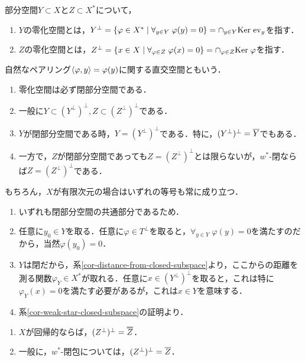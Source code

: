 \documentclass[uplatex,dvipdfmx]{jsreport}
\begin{document}
\begin{definition}[annihilator]
    部分空間$Y\subset X$と$Z\subset X^*$について，
    \begin{enumerate}
        \item $Y$の零化空間とは，$Y^\perp=\left\{\varphi\in X^*\mid\forall_{y\in Y}\;\varphi(y)=0\right\}=\cap_{y\in Y}\mathrm{Ker}\;\mathrm{ev}_y$を指す．
        \item $Z$の零化空間とは，$Z^\perp=\left\{x\in X\mid\forall_{\varphi\in Z}\;\varphi(x)=0\right\}=\cap_{\varphi\in Z}\mathrm{Ker}\;\varphi$を指す．
    \end{enumerate}
    自然なペアリング$\langle\varphi,y\rangle=\varphi(y)$に関する直交空間ともいう．
\end{definition}

\begin{lemma}[零化空間の基本性質]\mbox{}
    \begin{enumerate}
        \item 零化空間は必ず閉部分空間である．
        \item 一般に$Y\subset(Y^\perp)^\perp,Z\subset(Z^\perp)^\perp$である．
        \item $Y$が閉部分空間である時，$Y=(Y^\perp)^\perp$である．特に，$(Y^\perp)^\perp=\overline{Y}$でもある．
        \item 一方で，$Z$が閉部分空間であっても$Z=(Z^\perp)^\perp$とは限らないが，$w^*$-閉ならば$Z=(Z^\perp)^\perp$である．
    \end{enumerate}
    もちろん，$X$が有限次元の場合はいずれの等号も常に成り立つ．
\end{lemma}
\begin{Proof}\mbox{}
    \begin{enumerate}
        \item いずれも閉部分空間の共通部分であるため．
        \item 任意に$y_0\in Y$を取る．任意に$\varphi\in T^\perp$を取ると，$\forall_{y\in Y}\;\varphi(y)=0$を満たすのだから，当然$\varphi(y_0)=0$．
        \item $Y$は閉だから，系\ref{cor-distance-from-closed-subspace}より，ここからの距離を測る関数$\varphi_Y\in X^*$が取れる．任意に$x\in (Y^\perp)^\perp$を取ると，これは特に$\varphi_Y(x)=0$を満たす必要があるが，これは$x\in Y$を意味する．
        \item 系\ref{cor-weak-star-closed-subspace}の証明より．
    \end{enumerate}
\end{Proof}

\begin{proposition}\mbox{}
    \begin{enumerate}
        \item $X$が回帰的ならば，$(Z^\perp)^\perp=\oo{Z}$．
        \item 一般に，$w^*$-閉包については，$(Z^\perp)^\perp=\overline{Z}$．
    \end{enumerate}
\end{proposition}
\end{document}
